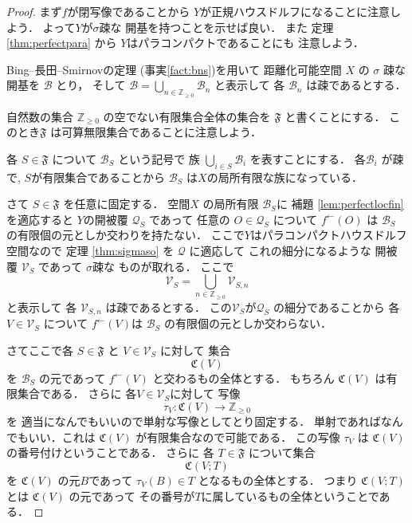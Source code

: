 \documentclass[leqno, a4paper, 12pt]{jsarticle}
\newcommand{\zz}{\mathbb{Z}}
\newcommand{\myinv}[1]{#1^{\gets}}
\newcommand{\myps}{\mathfrak{F}}
\newcommand{\mycrset}[1]{\mathfrak{C}(#1)}
\newcommand{\mysha}[1]{\tau_{#1}}
\begin{document}
\begin{proof}
まず$f$が閉写像であることから
$Y$が正規ハウスドルフになることに注意しよう．
よって$Y$が$\sigma$疎な
開基を持つことを示せば良い．
また
定理
\ref{thm:perfectpara}
から
$Y$はパラコンパクトであることにも
注意しよう．

Bing--長田--Smirnovの定理
(事実\ref{fact:bns})を用いて
距離化可能空間
$X$
の
$\sigma$
疎な開基を
$\mathcal{B}$
とり，
そして
$\mathcal{B}=\bigcup_{n\in \zz_{\ge 0}}\mathcal{B}_{n}$
と表示して
各
$\mathcal{B}_{n}$
は疎であるとする．




自然数の集合
$\zz_{\ge 0}$
の空でない有限集合全体の集合を
$\myps$
と書くことにする．
このとき$\myps$
は可算無限集合であることに注意しよう．

各
$S\in \myps$
について
$\mathcal{B}_{S}$
という記号で
族
$\bigcup_{i\in S}\mathcal{B}_{i}$
を表すことにする．
各$\mathcal{B}_{i}$
が疎で,
$S$が有限集合であることから
$\mathcal{B}_{S}$
は$X$の局所有限な族になっている．


さて
$S\in \myps$
を任意に固定する．
空間$X$
の局所有限
$\mathcal{B}_{S}$に
補題
\ref{lem:perfectlocfin}
を適応すると
$Y$の開被覆
$\mathcal{Q}_{S}$
であって
任意の
$O\in \mathcal{Q}_{S}$
について
$\myinv{f}(O)$
は
$\mathcal{B}_{S}$
の有限個の元としか交わりを持たない．
ここで$Y$はパラコンパクトハウスドルフ空間なので
定理
\ref{thm:sigmaso}
を
$\mathcal{Q}$
に適応して
これの細分になるような
開被覆
$\mathcal{V}_{S}$
であって
$\sigma$疎な
ものが取れる．
ここで
\[
\mathcal{V}_{S}=\bigcup_{n\in \zz_{\ge 0}}\mathcal{V}_{S, n}
\]
と表示して
各
$\mathcal{V}_{S, n}$
は疎であるとする．
この$\mathcal{V}_{S}$が$\mathcal{Q}_{S}$
の細分であることから
各$V\in \mathcal{V}_{S}$
について
$\myinv{f}(V)$は
$\mathcal{B}_{S}$
の有限個の元としか交わらない．



さてここで各
$S\in \myps$
と
$V\in \mathcal{V}_{S}$
に対して
集合
\[
\mycrset{V}
\]
を
$\mathcal{B}_{S}$
の元であって
$\myinv{f}(V)$
と交わるもの全体とする．
もちろん
$\mycrset{V}$
は有限集合である．
さらに
各$V\in \mathcal{V}_{S}$に対して
写像
\[
\mysha{V}\colon \mycrset{V}\to \zz_{\ge 0}
\]
を
適当になんでもいいので単射な写像としてとり固定する．
単射であればなんでもいい．これは
$\mycrset{V}$
が有限集合なので可能である．
この写像
$\mysha{V}$
は
$\mycrset{V}$の番号付けということである．
さらに
各
$T\in \myps$
について集合
\[
\mycrset{V; T}
\]
を
$\mycrset{V}$
の元$B$であって
$\mysha{V}(B)\in T$
となるもの全体とする．
つまり
$\mycrset{V; T}$
とは
$\mycrset{V}$
の元であって
その番号が$T$に属しているもの全体ということである．



\end{proof}
\end{document}
